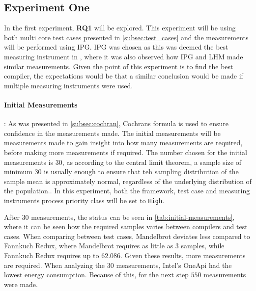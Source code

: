 \subsection{Experiment One}\label{subsec:exp_one}

In the first experiment, \textbf{RQ1} will be explored. This experiment will be using both multi core test cases presented in \cref{subsec:test_cases} and the measurements will be performed using IPG. IPG was chosen as this was deemed the best measuring instrument in \cite{biksbois}, where it was also observed how IPG and LHM made similar measurements. Given the point of this experiment is to find the best compiler, the expectations would be that a similar conclusion would be made if multiple measuring instruments were used.  

\paragraph{Initial Measurements}: As was presented in \cref{subsec:cochran}, Cochrans formula is used to ensure confidence in the measurements made. The initial measurements will be measurements made to gain insight into how many measurements are required, before making more measurements if required. The number chosen for the initial measurements is 30, as according to the central limit theorem, a sample size of minimum 30 is usually enough to ensure that teh sampling distribution of the sample mean is approximately normal, regardless of the underlying distribution of the population.\cite{central-limit-theorem}. In this experiment, both the framework, test case and measuring instruments process priority class will be set to \texttt{High}.



After 30 measurements, the status can be seen in \cref{tab:initial-measurements}, where it can be seen how the required samples varies between compilers and test cases. When comparing between test cases, Mandelbrot deviates less compared to Fannkuch Redux, where Mandelbrot requires as little as $3$ samples, while Fannkuch Redux requires up to $62.086$. Given these results, more measurements are required. When analyzing the 30 measurements, Intel's OneApi had the lowest energy consumption. Because of this, for the next step $550$ measurements were made.




